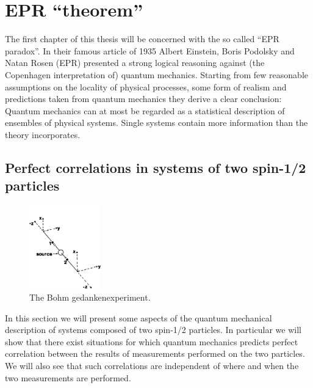 \chapter{EPR ``theorem''}
\label{chap:epr}
The first chapter of this thesis will be concerned with the so called ``EPR paradox''. In their famous article of 1935 \cite{PhysRev.47.777} Albert Einstein, Boris Podolsky and Natan Rosen (EPR) presented a strong logical reasoning against (the Copenhagen interpretation of) quantum mechanics. Starting from few reasonable assumptions on the locality of physical processes, some form of realism and predictions taken from quantum mechanics they derive a clear conclusion: Quantum mechanics can at most be regarded as a statistical description of ensembles of physical systems. Single systems contain more information than the theory incorporates.%


\section{Perfect correlations in systems of two spin-1/2 particles}
\label{sec:two-spin1/2}

\begin{figure}
  \centering
  \includegraphics[width=0.275\textwidth]{Mainmatter/Chapter1/eprb-gedankenexperiment.png}
  \caption{The Bohm gedankenexperiment.}
  \label{fig:eprb-gedankenexperiment}
\end{figure}

In this section we will present some aspects of the quantum mechanical description of systems composed of two spin-1/2 particles. In particular we will show that there exist situations for which quantum mechanics predicts perfect correlation between the results of measurements performed on the two particles. We will also see that such correlations are independent of where and when the two measurements are performed.%


